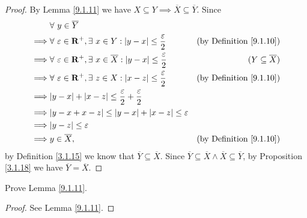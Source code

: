 \begin{proof}
    By Lemma \ref{9.1.11} we have \(X \subseteq Y \implies \overline{X} \subseteq \overline{Y}\).
    Since
    \begin{align*}
                 & \forall\ y \in \overline{Y}                                                                                                                        \\
        \implies & \forall\ \varepsilon \in \mathbf{R}^+, \exists\ x \in Y : \abs*{y - x} \leq \frac{\varepsilon}{2}            & \text{(by Definition \ref{9.1.10})} \\
        \implies & \forall\ \varepsilon \in \mathbf{R}^+, \exists\ x \in \overline{X} : \abs*{y - x} \leq \frac{\varepsilon}{2} & (Y \subseteq \overline{X})          \\
        \implies & \forall\ \varepsilon \in \mathbf{R}^+, \exists\ z \in X : \abs*{x - z} \leq \frac{\varepsilon}{2}            & \text{(by Definition \ref{9.1.10})} \\
        \implies & \abs*{y - x} + \abs*{x - z} \leq \frac{\varepsilon}{2} + \frac{\varepsilon}{2}                                                                     \\
        \implies & \abs*{y - x + x - z} \leq \abs*{y - x} + \abs*{x - z} \leq \varepsilon                                                                             \\
        \implies & \abs*{y - z} \leq \varepsilon                                                                                                                      \\
        \implies & y \in \overline{X},                                                                                          & \text{(by Definition \ref{9.1.10})}
    \end{align*}
    by Definition \ref{3.1.15} we know that \(\overline{Y} \subseteq \overline{X}\).
    Since \(\overline{Y} \subseteq \overline{X} \land \overline{X} \subseteq \overline{Y}\), by Proposition \ref{3.1.18} we have \(\overline{Y} = \overline{X}\).
\end{proof}

\begin{exercise}\label{ex 9.1.2}
    Prove Lemma \ref{9.1.11}.
\end{exercise}

\begin{proof}
    See Lemma \ref{9.1.11}.
\end{proof}

